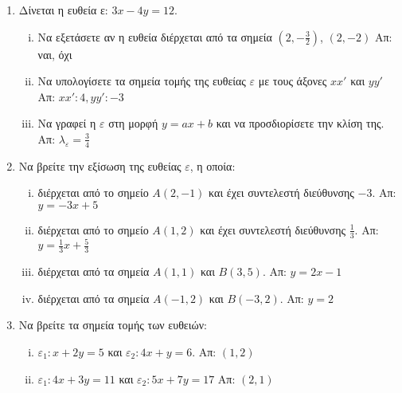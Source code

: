 


\pagestyle{vangelis}



\begin{center}
  \minibox{\large\bfseries \textcolor{Col1}{Ευθείες}}
\end{center}

\vspace{\baselineskip}

\begin{enumerate}
  \item  Δίνεται η ευθεία ε:  $ 3x - 4y = 12 $.
    \begin{enumerate}[i)]
      \item Να εξετάσετε αν η ευθεία διέρχεται από τα σημεία $\left(2,- \frac{3}{2}
        \right)$, $ (2,-2) $ \hfill Απ:  ναι, όχι 
      \item  Να υπολογίσετε τα σημεία τομής της ευθείας $ \varepsilon $  
        με τους άξονες  $ xx' $  και  $ yy' $ \hfill Απ: $ xx': 4, yy':-3 $ 
      \item Να γραφεί η $ \varepsilon $ στη μορφή $ y=ax+b $ και να 
        προσδιορίσετε την κλίση της. 
        \hfill Απ: $ \lambda_{\varepsilon} = \frac{3}{4} $ 
    \end{enumerate}

  \item  Να βρείτε την εξίσωση της ευθείας  $ \varepsilon $, η οποία: 
    \begin{enumerate}[i)]
      \item διέρχεται από το σημείο  $ A(2,-1) $ και έχει συντελεστή διεύθυνσης 
        $ -3 $.  \hfill Απ: $ y = -3x+5 $ 
      \item διέρχεται από το σημείο  $ A(1,2) $ και έχει συντελεστή διεύθυνσης 
        $ \frac{1}{3} $.  \hfill Απ: $ y = \frac{1}{3} x + \frac{5}{3} $ 
      \item διέρχεται από τα σημεία  $ A(1,1) $  και  $ B(3,5) $. 
        \hfill Απ: $ y=2x-1 $ 
      \item διέρχεται από τα σημεία  $ A(-1,2) $  και  $ B(-3,2) $. 
        \hfill Απ: $ y=2 $ 
    \end{enumerate}

  \item  Να βρείτε τα  σημεία τομής των ευθειών:
    \begin{enumerate}[i)]
      \item $ \varepsilon_{1}: x + 2y = 5 $   και  $\varepsilon_{2}: 4x + y = 6 $.
        \hfill Απ: $ (1,2) $ 
      \item $ \varepsilon_{1}: 4x+3y=11 $ και  $ \varepsilon_{2}: 5x+7y=17 $ 
        \hfill Απ: $ (2,1) $ 
    \end{enumerate}


\end{enumerate}
